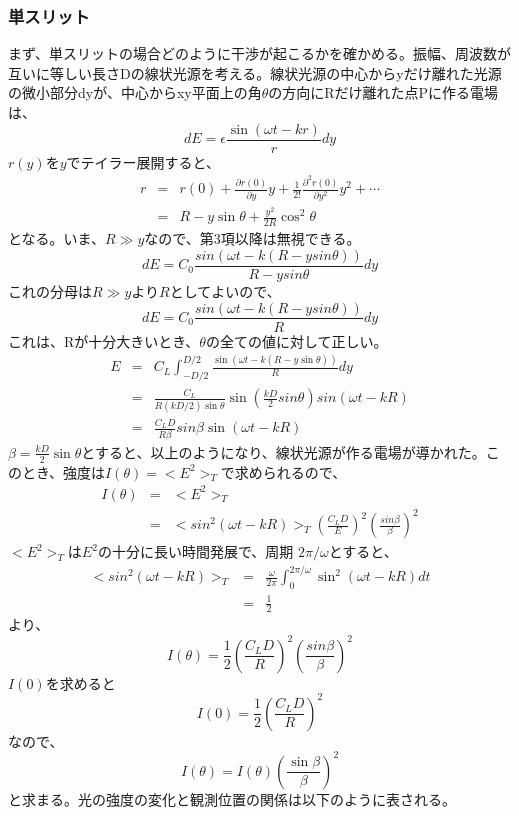 \documentclass[10pt]{ujarticle}
\begin{document}
\subsubsection{単スリット}
まず、単スリットの場合どのように干渉が起こるかを確かめる。振幅、周波数が互いに等しい長さDの線状光源を考える。線状光源の中心からyだけ離れた光源の微小部分dyが、中心からxy平面上の角$\theta$の方向にRだけ離れた点Pに作る電場は、
\[
dE = \epsilon \frac{\sin(\omega t - kr)}{r} dy
\]
$r(y)$を$y$でテイラー展開すると、
\begin{eqnarray*}
r &=&r(0) + \frac{\partial r(0)}{\partial y} y + \frac{1}{2!} \frac{\partial^2 r(0)}{\partial y^2} y^2 + \cdots \\
&=&R - y\sin\theta + \frac{y^2}{2R} \cos^2 \theta
\end{eqnarray*}
となる。いま、$R \gg y$なので、第3項以降は無視できる。
\[
dE = C_0 \frac{sin(\omega t -k(R- ysin\theta ))}{R- ysin\theta} dy
\]
これの分母は$R \gg y$より$R$としてよいので、
\[
dE = C_0 \frac{sin(\omega t -k(R- ysin\theta ))}{R} dy
\]
これは、Rが十分大きいとき、$\theta$の全ての値に対して正しい。
\begin{eqnarray*}
E &=& C_L \int_{-D/2}^{D/2} \frac{\sin(\omega t - k( R - y\sin\theta ))}{R} dy \\
&=& \frac{C_L}{R(kD/2)\sin\theta} \sin(\frac{kD}{2} sin\theta) sin(\omega t -kR) \\
&=& \frac{C_L D}{R\beta} sin\beta \sin(\omega t - kR)
\end{eqnarray*}
$\beta = \frac{kD}{2} \sin\theta$とすると、以上のようになり、線状光源が作る電場が導かれた。このとき、強度は$I(\theta) = <E^2>_T$で求められるので、
\begin{eqnarray*}
I(\theta) &=& < E^2>_T\\
&=& <sin^2(\omega t - kR)>_T (\frac{C_L D}{E})^2 (\frac{sin\beta}{\beta})^2
\end{eqnarray*}
$<E^2>_T$は$E^2$の十分に長い時間発展で、周期 $2\pi / \omega$とすると、
\begin{eqnarray*}
 <sin^2(\omega t - kR)>_T  &=& \frac{\omega}{2\pi} \int_{0}^{2\pi / \omega} \sin^2(\omega t - kR) dt \\
 &=& \frac{1}{2} 
 \end{eqnarray*}
 より、
\[
I(\theta) = \frac{1}{2} (\frac{C_L D}{R})^2 (\frac{sin \beta}{\beta})^2
\]
$I(0)$を求めると
\[
I(0) = \frac{1}{2} (\frac{C_L D}{R})^2
\]
なので、
\[
I(\theta) = I(\theta) (\frac{\sin \beta}{\beta})^2
\]
と求まる。光の強度の変化と観測位置の関係は以下のように表される。\\
\end{document}
